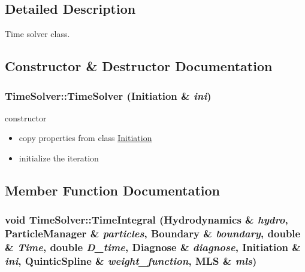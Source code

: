 \subsection{Detailed Description}
Time solver class. 

\subsection{Constructor \& Destructor Documentation}
\hypertarget{classTimeSolver_c5ed4d99be532dd9c3e77424b3e7a60a}{
\subsubsection[{TimeSolver}]{\setlength{\rightskip}{0pt plus 5cm}TimeSolver::TimeSolver ({\bf Initiation} \& {\em ini})}}
\label{classTimeSolver_c5ed4d99be532dd9c3e77424b3e7a60a}


constructor 



\begin{itemize}
\item copy properties from class \hyperlink{classInitiation}{Initiation}\end{itemize}


\begin{itemize}
\item initialize the iteration \end{itemize}


\subsection{Member Function Documentation}
\hypertarget{classTimeSolver_edd74b3f1e292277b972b938787f4a3c}{
\subsubsection[{TimeIntegral}]{\setlength{\rightskip}{0pt plus 5cm}void TimeSolver::TimeIntegral ({\bf Hydrodynamics} \& {\em hydro}, \/  {\bf ParticleManager} \& {\em particles}, \/  {\bf Boundary} \& {\em boundary}, \/  double \& {\em Time}, \/  double {\em D\_\-time}, \/  {\bf Diagnose} \& {\em diagnose}, \/  {\bf Initiation} \& {\em ini}, \/  {\bf QuinticSpline} \& {\em weight\_\-function}, \/  {\bf MLS} \& {\em mls})}}
\label{classTimeSolver_edd74b3f1e292277b972b938787f4a3c}


